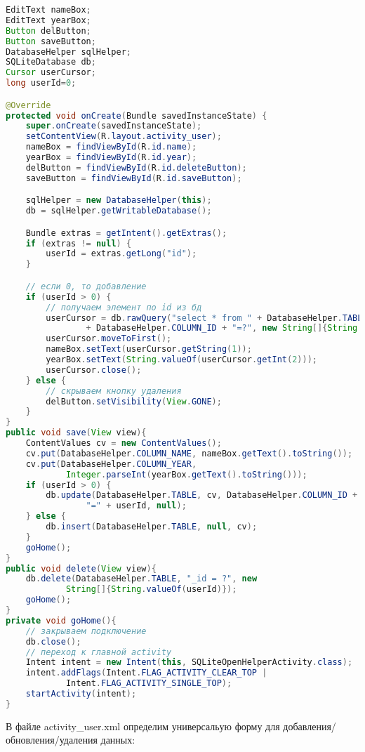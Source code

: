 \begin{lstlisting}[language=Java
	, label=lst:
	]
EditText nameBox;
EditText yearBox;
Button delButton;
Button saveButton;
DatabaseHelper sqlHelper;
SQLiteDatabase db;
Cursor userCursor;
long userId=0;

@Override
protected void onCreate(Bundle savedInstanceState) {
	super.onCreate(savedInstanceState);
	setContentView(R.layout.activity_user);
	nameBox = findViewById(R.id.name);
	yearBox = findViewById(R.id.year);
	delButton = findViewById(R.id.deleteButton);
	saveButton = findViewById(R.id.saveButton);

	sqlHelper = new DatabaseHelper(this);
	db = sqlHelper.getWritableDatabase();

	Bundle extras = getIntent().getExtras();
	if (extras != null) {
		userId = extras.getLong("id");
	}

	// если 0, то добавление
	if (userId > 0) {
		// получаем элемент по id из бд
		userCursor = db.rawQuery("select * from " + DatabaseHelper.TABLE + " where "
				+ DatabaseHelper.COLUMN_ID + "=?", new String[]{String.valueOf(userId)});
		userCursor.moveToFirst();
		nameBox.setText(userCursor.getString(1));
		yearBox.setText(String.valueOf(userCursor.getInt(2)));
		userCursor.close();
	} else {
		// скрываем кнопку удаления
		delButton.setVisibility(View.GONE);
	}
}
public void save(View view){
	ContentValues cv = new ContentValues();
	cv.put(DatabaseHelper.COLUMN_NAME, nameBox.getText().toString());
	cv.put(DatabaseHelper.COLUMN_YEAR,
			Integer.parseInt(yearBox.getText().toString()));
	if (userId > 0) {
		db.update(DatabaseHelper.TABLE, cv, DatabaseHelper.COLUMN_ID +
				"=" + userId, null);
	} else {
		db.insert(DatabaseHelper.TABLE, null, cv);
	}
	goHome();
}
public void delete(View view){
	db.delete(DatabaseHelper.TABLE, "_id = ?", new
			String[]{String.valueOf(userId)});
	goHome();
}
private void goHome(){
	// закрываем подключение
	db.close();
	// переход к главной activity
	Intent intent = new Intent(this, SQLiteOpenHelperActivity.class);
	intent.addFlags(Intent.FLAG_ACTIVITY_CLEAR_TOP |
			Intent.FLAG_ACTIVITY_SINGLE_TOP);
	startActivity(intent);
}
\end{lstlisting}

В файле activity\_user.xml определим универсальую форму для
добавления/обновления/удаления данных:

